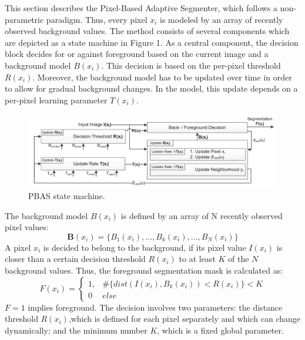 This section describes the Pixel-Based Adaptive Segmenter, which follows a non-parametric paradigm. Thus, every pixel $x_i$ is modeled by an array of recently observed background values. The method consists of several components which are depicted as a state machine in Figure 1. As a central component, the decision block decides for or against foreground based on the current image and a background model $B(x_i)$. This decision is based on the per-pixel threshold $R(x_i)$. Moreover, the background model has to be updated over time in order to allow for gradual background changes. In the model, this update depends on a per-pixel learning parameter $T(x_i)$.
\newline
\begin{figure}
    \includegraphics[width=\textwidth]{Figures/PBAS_state_machine.png}
    \caption{PBAS state machine.}
\end{figure}

The background model $B(x_i)$ is defined by an array of N recently observed pixel values:
\begin{equation}
\mathbf{B}(x_i) = \{B_1(x_i),...,B_k(x_i),...,B_N(x_i)\}
\end{equation}
A pixel $x_i$ is decided to belong to the background, if its
pixel value $I(x_i) $ is closer than a certain decision threshold
$R(x_i)$ to at least $K$ of the $N$ background values. Thus,
the foreground segmentation mask is calculated as:
\begin{equation} \label{eq:F}
F(x_i) = \begin{cases} 1,& \#\{dist(I(x_i), B_k(x_i)) < R(x_i)\} < K \\0 &else\end{cases}
\end{equation}
$F = 1$ implies foreground. The decision involves two parameters: the distance threshold $R(x_i)$,which is defined for each pixel separately and which can change dynamically; and the minimum number $K$, which is a fixed global parameter.
